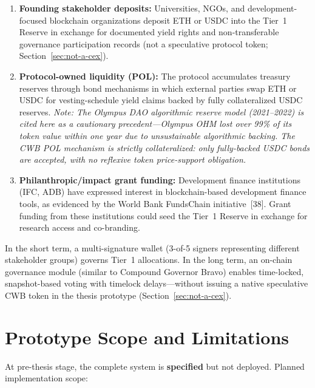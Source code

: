 \documentclass[12pt,a4paper]{report}
\begin{document}
\begin{enumerate}[noitemsep]
\item \textbf{Founding stakeholder deposits:} Universities, NGOs, and development-focused blockchain organizations deposit ETH or USDC into the Tier~1 Reserve in exchange for documented yield rights and non-transferable governance participation records (not a speculative protocol token; Section~\ref{sec:not-a-cex}).
\item \textbf{Protocol-owned liquidity (POL):} The protocol accumulates treasury reserves through bond mechanisms in which external parties swap ETH or USDC for vesting-schedule yield claims backed by fully collateralized USDC reserves. \textit{Note: The Olympus DAO algorithmic reserve model (2021--2022) is cited here as a cautionary precedent---Olympus OHM lost over 99\% of its token value within one year due to unsustainable algorithmic backing. The CWB POL mechanism is strictly collateralized: only fully-backed USDC bonds are accepted, with no reflexive token price-support obligation.}
\item \textbf{Philanthropic/impact grant funding:} Development finance institutions (IFC, ADB) have expressed interest in blockchain-based development finance tools, as evidenced by the World Bank FundsChain initiative~[38]. Grant funding from these institutions could seed the Tier~1 Reserve in exchange for research access and co-branding.
\end{enumerate}

In the short term, a multi-signature wallet (3-of-5 signers representing different stakeholder groups) governs Tier~1 allocations. In the long term, an on-chain governance module (similar to Compound Governor Bravo) enables time-locked, snapshot-based voting with timelock delays---without issuing a native speculative CWB token in the thesis prototype (Section~\ref{sec:not-a-cex}).

\section{Prototype Scope and Limitations}

At pre-thesis stage, the complete system is \textbf{specified} but not deployed. Planned implementation scope:
\end{document}
